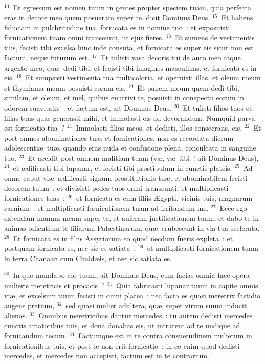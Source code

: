 ${}^{14}$~Et egressum est nomen tuum in gentes propter speciem tuam, quia perfecta eras in decore meo quem posueram super te, dicit Dominus Deus.
${}^{15}$~Et habens fiduciam in pulchritudine tua, fornicata es in nomine tuo~: et exposuisti fornicationem tuam omni transeunti, ut ejus fieres.
${}^{16}$~Et sumens de vestimentis tuis, fecisti tibi excelsa hinc inde consuta, et fornicata es super eis sicut non est factum, neque futurum est.
${}^{17}$~Et tulisti vasa decoris tui de auro meo atque argento meo, qu\ae\ dedi tibi, et fecisti tibi imagines masculinas, et fornicata es in eis.
${}^{18}$~Et sumpsisti vestimenta tua multicoloria, et operuisti illas, et oleum meum et thymiama meum posuisti coram eis.
${}^{19}$~Et panem meum quem dedi tibi, similam, et oleum, et mel, quibus enutrivi te, posuisti in conspectu eorum in odorem suavitatis~: et factum est, ait Dominus Deus.
${}^{20}$~Et tulisti filios tuos et filias tuas quas generasti mihi, et immolasti eis ad devorandum. Numquid parva est fornicatio tua~?
${}^{21}$~Immolasti filios meos, et dedisti, illos consecrans, eis.
${}^{22}$~Et post omnes abominationes tuas et fornicationes, non es recordata dierum adolescenti\ae\ tu\ae , quando eras nuda et confusione plena, conculcata in sanguine tuo.
${}^{23}$~Et accidit post omnem malitiam tuam (v\ae , v\ae\ tibi~! ait Dominus Deus),
${}^{24}$~et \ae dificasti tibi lupanar, et fecisti tibi prostibulum in cunctis plateis.
${}^{25}$~Ad omne caput vi\ae\ \ae dificasti signum prostitutionis tu\ae , et abominabilem fecisti decorem tuum~: et divisisti pedes tuos omni transeunti, et multiplicasti fornicationes tuas~:
${}^{26}$~et fornicata es cum filiis \AE gypti, vicinis tuis, magnarum carnium~: et multiplicasti fornicationem tuam ad irritandum me.
${}^{27}$~Ecce ego extendam manum meam super te, et auferam justificationem tuam, et dabo te in animas odientium te filiarum Pal\ae stinarum, qu\ae\ erubescunt in via tua scelerata.
${}^{28}$~Et fornicata es in filiis Assyriorum eo quod necdum fueris expleta~: et postquam fornicata es, nec sic es satiata~:
${}^{29}$~et multiplicasti fornicationem tuam in terra Chanaan cum Chald\ae is, et nec sic satiata es.


${}^{30}$~In quo mundabo cor tuum, ait Dominus Deus, cum facias omnia h\ae c opera mulieris meretricis et procacis~?
${}^{31}$~Quia fabricasti lupanar tuum in capite omnis vi\ae , et excelsum tuum fecisti in omni platea~: nec facta es quasi meretrix fastidio augens pretium,
${}^{32}$~sed quasi mulier adultera, qu\ae\ super virum suum inducit alienos.
${}^{33}$~Omnibus meretricibus dantur mercedes~: tu autem dedisti mercedes cunctis amatoribus tuis, et dona donabas eis, ut intrarent ad te undique ad fornicandum tecum.
${}^{34}$~Factumque est in te contra consuetudinem mulierum in fornicationibus tuis, et post te non erit fornicatio~: in eo enim quod dedisti mercedes, et mercedes non accepisti, factum est in te contrarium.


